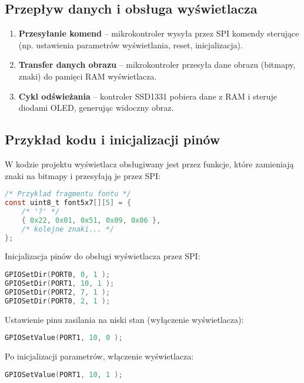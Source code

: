 \documentclass[letterpaper,11pt]{report}
\begin{document}
\subsection{Przepływ danych i obsługa wyświetlacza}

\begin{enumerate}
    \item \textbf{Przesyłanie komend} – mikrokontroler wysyła przez SPI komendy sterujące (np. ustawienia parametrów wyświetlania, reset, inicjalizacja).
    \item \textbf{Transfer danych obrazu} – mikrokontroler przesyła dane obrazu (bitmapy, znaki) do pamięci RAM wyświetlacza.
    \item \textbf{Cykl odświeżania} – kontroler SSD1331 pobiera dane z RAM i steruje diodami OLED, generując widoczny obraz.
\end{enumerate}

\subsection{Przykład kodu i inicjalizacji pinów}

W kodzie projektu wyświetlacz obsługiwany jest przez funkcje, które zamieniają znaki na bitmapy i przesyłają je przez SPI:

\begin{lstlisting}[language=C]
/* Przyklad fragmentu fontu */
const uint8_t font5x7[][5] = {
    /* '?' */
    { 0x22, 0x01, 0x51, 0x09, 0x06 },
    /* kolejne znaki... */
};
\end{lstlisting}

Inicjalizacja pinów do obsługi wyświetlacza przez SPI:
\begin{lstlisting}[language=C]
GPIOSetDir(PORT0, 0, 1 );
GPIOSetDir(PORT1, 10, 1 );
GPIOSetDir(PORT2, 7, 1 );
GPIOSetDir(PORT0, 2, 1 );
\end{lstlisting}

Ustawienie pinu zasilania na niski stan (wyłączenie wyświetlacza):
\begin{lstlisting}[language=C]
GPIOSetValue(PORT1, 10, 0 );
\end{lstlisting}
Po inicjalizacji parametrów, włączenie wyświetlacza:
\begin{lstlisting}[language=C]
GPIOSetValue(PORT1, 10, 1 );
\end{lstlisting}
\end{document}
